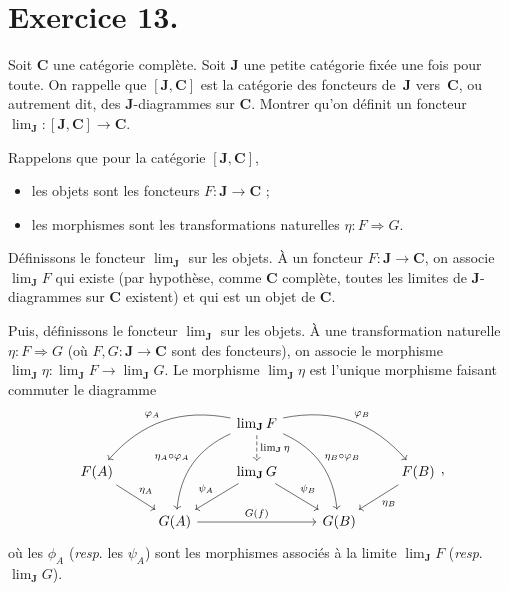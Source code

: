 \documentclass{../../td}
\begin{document}
  \chapter{Exercice 13.}

  \begin{slshape}
    \color{deepblue}
    Soit $\mathbf{C}$ une catégorie complète. Soit $\mathbf{J}$ une petite catégorie fixée une fois pour toute. On rappelle que $[\mathbf{J},\mathbf{C}]$ est la catégorie des foncteurs de~$\mathbf{J}$ vers~$\mathbf{C}$, ou autrement dit, des $\mathbf{J}$-diagrammes sur $\mathbf{C}$. Montrer qu'on définit un foncteur $\lim_\mathbf{J} : [\mathbf{J},\mathbf{C}] \to \mathbf{C}$.
  \end{slshape}

  Rappelons que pour la catégorie $[\mathbf{J},\mathbf{C}]$,
  \begin{itemize}
    \item les objets sont les foncteurs $F : \mathbf{J} \to \mathbf{C}$ ;
    \item les morphismes sont les transformations naturelles $\eta : F \Rightarrow G$. 
  \end{itemize}

  Définissons le foncteur $\lim_\mathbf{J}$ sur les objets.
  À un foncteur $F : \mathbf{J} \to \mathbf{C}$, on associe $\lim_\mathbf{J} F$ qui existe (par hypothèse, comme $\mathbf{C}$ complète, toutes les limites de $\mathbf{J}$-diagrammes sur $\mathbf{C}$ existent) et qui est un objet de $\mathbf{C}$.

  Puis, définissons le foncteur $\lim_\mathbf{J}$ sur les objets.
  À une transformation naturelle $\eta : F \Rightarrow G$ (où $F, G : \mathbf{J} \to \mathbf{C}$ sont des foncteurs), on associe le morphisme $\lim_\mathbf{J} \eta : \lim_\mathbf{J} F \to \lim_\mathbf{J} G$.
  Le morphisme $\lim_\mathbf{J} \eta$ est l'unique morphisme faisant commuter le diagramme 
  \[
  \begin{tikzcd}
      && \lim_\mathbf{J} F \arrow[dashed]{d}{\lim_\mathbf{J} \eta} \arrow[bend right,swap]{ddl}{\eta_A \circ \varphi_A} \arrow[bend right,swap]{dll}{\varphi_A} \arrow[bend left]{drr}{\varphi_B} \arrow[bend left]{ddr}{\eta_B \circ \varphi_B}\\
      F(A) \arrow{dr}{\eta_A}&& \lim_\mathbf{J} G \arrow[swap]{dl}{\psi_A} \arrow{dr}{\psi_B} && F(B) \arrow{dl}{\eta_B}\\
      &G(A) \arrow{rr}{G(f)} & & G(B)&
  \end{tikzcd}
  ,\] 
  où les $\phi_A$ (\textit{resp}. les $\psi_A$) sont les morphismes associés à la limite $\lim_\mathbf{J} F$ (\textit{resp}. $\lim_\mathbf{J} G$).
\end{document}

